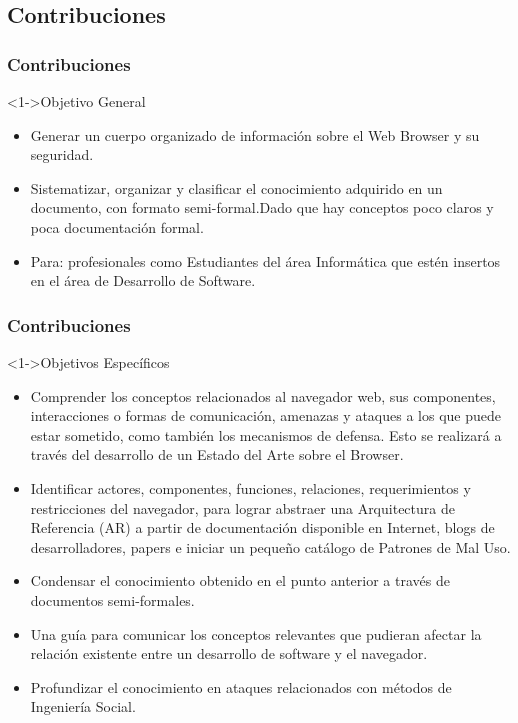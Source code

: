 \documentclass[serif,9pt]{beamer}
\begin{document}
\subsection{Contribuciones}
\begin{frame}
	\frametitle{Contribuciones}
	\begin{block}<1->{Objetivo General}
		\begin{itemize}
			\item<2-> Generar un cuerpo organizado de informaci\'on sobre el Web Browser y su seguridad.
			\item<3-> Sistematizar, organizar y clasificar el conocimiento adquirido en un documento, con formato semi-formal.Dado que hay conceptos poco claros y poca documentación formal.
			\item<4-> Para: profesionales como Estudiantes del \'area Inform\'atica que est\'en insertos en el \'area de Desarrollo de Software.
		\end{itemize}
	\end{block}
\end{frame}

\begin{frame}
	\frametitle{Contribuciones}
	\begin{block}<1->{Objetivos Espec\'ificos}
		\begin{itemize}
			\item<2-> Comprender los conceptos relacionados al navegador web, sus componentes, interacciones o formas de comunicaci\'on, amenazas y ataques a los que puede estar sometido, como tambi\'en los mecanismos de defensa. Esto se realizar\'a a trav\'es del desarrollo de un Estado del Arte sobre el Browser.
			\item<3-> Identificar actores, componentes, funciones, relaciones, requerimientos y restricciones del navegador, para lograr abstraer una Arquitectura de Referencia (AR) a partir de documentaci\'on disponible en Internet, blogs de desarrolladores, papers e iniciar un pequeño cat\'alogo de Patrones de Mal Uso. 
			\item<4-> Condensar el conocimiento obtenido en el punto anterior a trav\'es de documentos semi-formales.
			\item<5-> Una gu\'ia para comunicar los conceptos relevantes que pudieran afectar la relaci\'on existente entre un desarrollo de software y el navegador.
			\item<6-> Profundizar el conocimiento en ataques relacionados con m\'etodos de Ingenier\'ia Social.
		\end{itemize}
	\end{block}
\end{frame}
\end{document}
